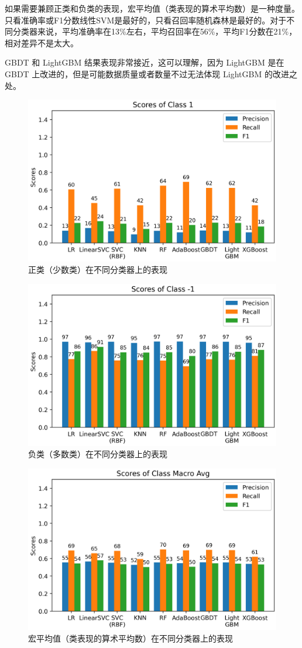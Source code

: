 \documentclass[a4paper]{article}
\begin{document}
如果需要兼顾正类和负类的表现，宏平均值（类表现的算术平均数）是一种度量。只看准确率或F1分数线性SVM是最好的，只看召回率随机森林是最好的。对于不同分类器来说，平均准确率在13\%左右，平均召回率在56\%，平均F1分数在21\%，相对差异不是太大。


GBDT 和 LightGBM 结果表现非常接近，这可以理解，因为 LightGBM 是在 GBDT 上改进的，但是可能数据质量或者数量不过无法体现 LightGBM 的改进之处。

\begin{figure}[!h]
    \centering
    \includegraphics[width=0.8\linewidth]{pos.png}
    \caption{正类（少数类）在不同分类器上的表现}
    \label{fig:result:pos}
\end{figure}


\begin{figure}[!h]
    \centering
    \includegraphics[width=0.8\linewidth]{neg.png}
    \caption{负类（多数类）在不同分类器上的表现}
    \label{fig:result:neg}
\end{figure}

\begin{figure}[!h]
    \centering
    \includegraphics[width=0.8\linewidth]{avg.png}
    \caption{宏平均值（类表现的算术平均数）在不同分类器上的表现}
    \label{fig:result:avg}
\end{figure}
\end{document}
